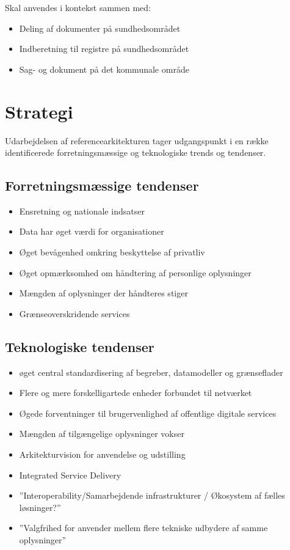 Skal anvendes i kontekst sammen med:

\begin{itemize}
\tightlist
\item
  Deling af dokumenter på sundhedsområdet
\item
  Indberetning til registre på sundhedsområdet
\item
  Sag- og dokument på det kommunale område
\end{itemize}

\section{Strategi}\label{strategi}

Udarbejdelsen af referencearkitekturen tager udgangspunkt i en række
identificerede forretningsmæssige og teknologiske trends og tendenser.

\subsection{Forretningsmæssige
tendenser}\label{forretningsmuxe6ssige-tendenser}

\begin{itemize}
\tightlist
\item
  Ensretning og nationale indsatser
\item
  Data har øget værdi for organisationer
\item
  Øget bevågenhed omkring beskyttelse af privatliv
\item
  Øget opmærksomhed om håndtering af personlige oplysninger
\item
  Mængden af oplysninger der håndteres stiger
\item
  Grænseoverskridende services
\end{itemize}

\subsection{Teknologiske tendenser}\label{teknologiske-tendenser}

\begin{itemize}
\tightlist
\item
  øget central standardisering af begreber, datamodeller og grænseflader
\item
  Flere og mere forskelligartede enheder forbundet til netværket
\item
  Øgede forventninger til brugervenlighed af offentlige digitale
  services
\item
  Mængden af tilgængelige oplysninger vokser
\item
  Arkitekturvision for anvendelse og udstilling
\item
  Integrated Service Delivery
\item
  ''Interoperability/Samarbejdende infrastrukturer / Økosystem af fælles
  løsninger?''
\item
  ''Valgfrihed for anvender mellem flere tekniske udbydere af samme
  oplysninger''
\end{itemize}

